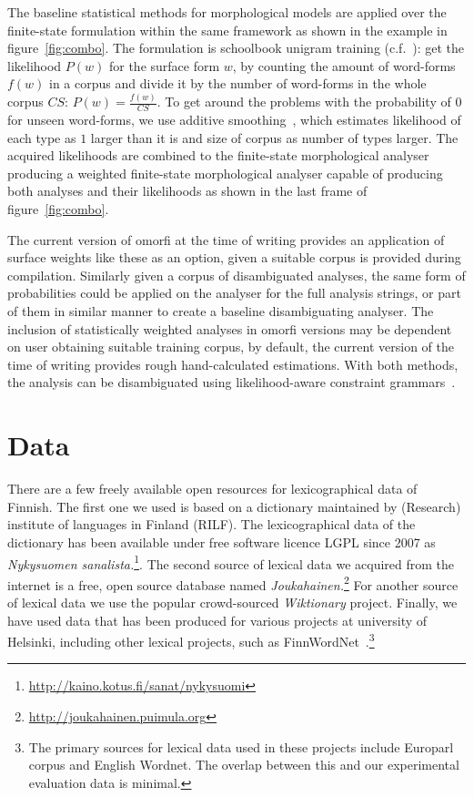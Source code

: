 \documentclass[a4paper,12pt]{article}
\begin{document}
The baseline statistical methods for morphological models are applied over the
finite-state formulation within the same framework as shown in the example in
figure~\ref{fig:combo}.  The formulation is
schoolbook unigram training (c.f.~\cite{manning}): get the likelihood $P(w)$
for the surface form $w$, by counting the amount of word-forms $f(w)$ in a
corpus and divide it by the number of word-forms in the whole corpus $CS$:
$P(w) = \frac{f(w)}{CS}$.  To get around the problems with the probability of
$0$ for unseen word-forms, we use additive smoothing~\citep{chen1999empirical},
which estimates likelihood of each type as $1$ larger than it is and size of
corpus as number of types larger. The acquired likelihoods are combined to the
finite-state morphological analyser producing a weighted finite-state
morphological analyser capable of producing both analyses and their likelihoods
as shown in the last frame of figure~\ref{fig:combo}.

The current version of omorfi at the time of writing provides an application of
surface weights like these as an option, given a suitable corpus is provided
during compilation. Similarly given a corpus of disambiguated analyses, the
same form of probabilities could be applied on the analyser for the full
analysis strings, or part of them in similar manner to create a baseline
disambiguating analyser. The inclusion of statistically weighted analyses in
omorfi versions may be dependent on user obtaining suitable training corpus, by
default, the current version of the time of writing provides rough
hand-calculated estimations. With both methods, the analysis can be
disambiguated using likelihood-aware constraint grammars~\cite{}.

\section{Data}
\label{sec:data}

There are a few freely available open resources for lexicographical data of
Finnish. The first one  we used is based on a dictionary maintained by
(Research) institute of languages in Finland (RILF). The lexicographical data
of the dictionary has been available under free software licence LGPL since
2007 as \emph{Nykysuomen
sanalista.}\footnote{\url{http://kaino.kotus.fi/sanat/nykysuomi}}.  The second
source of lexical data we acquired from the internet is a free, open source
database named
\emph{Joukahainen.}\footnote{\url{http://joukahainen.puimula.org}}  For another
source of lexical data we use the popular crowd-sourced \emph{Wiktionary}
project.  Finally, we have used data that has been produced for various
projects at university of Helsinki, including other lexical projects, such as
FinnWordNet~\citep{linden2010finnwordnet}.\footnote{The primary sources for
lexical data used in these projects include Europarl corpus and English
Wordnet.  The overlap between this and our experimental evaluation data is
minimal.} 
\end{document}

